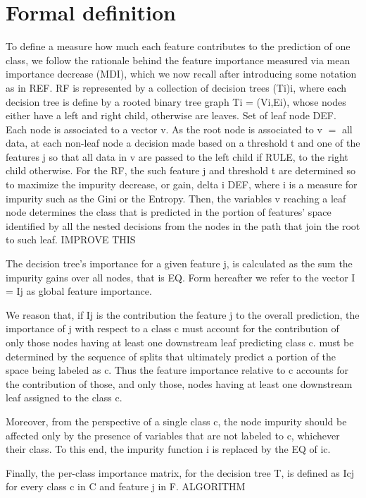 \documentclass[12pt,a4paper]{article}
\theoremstyle{definition}
\theoremstyle{plain}
\theoremstyle{remark}
\begin{document}
\section{Formal definition}\label{sec:definition}
To define a measure how much each feature contributes to the prediction of one class, we follow the rationale behind the feature importance measured via mean importance decrease (MDI), which we now recall after introducing some notation as in REF.
RF is represented by a collection of decision trees (Ti)i, where each decision tree is define by a rooted binary tree graph Ti = (Vi,Ei), whose nodes either have a left and right child, otherwise are leaves. Set of leaf node DEF. 
Each node is associated to a vector v.
As the root node is associated to v $=$ all data, at each non-leaf node a decision made based on a threshold t and one of the features j so that all data in v are passed to the left child if RULE, to the right child otherwise.
For the RF, the such feature j and threshold t are determined so to maximize the impurity decrease, or gain,
delta i DEF,
where i is a measure for impurity such as the Gini or the Entropy.
Then, the variables v reaching a leaf node determines the class that is predicted in the portion of features' space identified by all the nested decisions from the nodes in the path that join the root to such leaf. IMPROVE THIS

The decision tree's importance for a given feature j, is calculated as the sum the impurity gains over all nodes, that is
EQ.
Form hereafter we refer to the vector I = Ij as global feature importance. 

We reason that, if Ij is the contribution the feature j to the overall prediction, the importance of j with respect to a class c must account for the contribution of only those nodes having at least one downstream leaf predicting class c.
must be determined by the sequence of splits that ultimately predict a portion of the space being labeled as c. Thus the feature importance relative to c accounts for the contribution of those, and only those, nodes having at least one downstream leaf assigned to the class c.

Moreover, from the perspective of a single class c, the node impurity should be affected only by the presence of variables that are not labeled to c, whichever their class. To this end, the impurity function i is replaced by the 
EQ of ic.

Finally, the per-class importance matrix, for the decision tree T, is defined as
Icj
for every class c in C and feature j in F.
ALGORITHM
\end{document}
